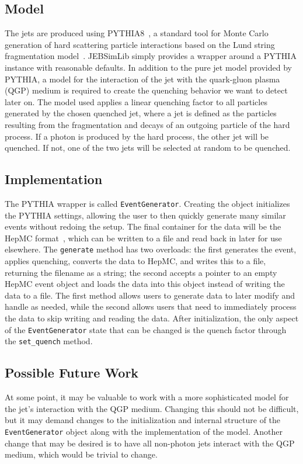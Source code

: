 \documentclass[11pt]{article}
\begin{document}
\subsection{Model}
The jets are produced using PYTHIA8~\cite{Sjostrand:2014zea}, a standard tool for Monte Carlo generation of hard scattering particle interactions based on the Lund string fragmentation model~\cite{Andersson:2002ap}. JEBSimLib simply provides a wrapper around a PYTHIA instance with reasonable defaults. In addition to the pure jet model provided by PYTHIA, a model for the interaction of the jet with the quark-gluon plasma (QGP) medium is required to create the quenching behavior we want to detect later on. The model used applies a linear quenching factor to all particles generated by the chosen quenched jet, where a jet is defined as the particles resulting from the fragmentation and decays of an outgoing particle of the hard process. If a photon is produced by the hard process, the other jet will be quenched. If not, one of the two jets will be selected at random to be quenched.

\subsection{Implementation}
The PYTHIA wrapper is called \texttt{EventGenerator}. Creating the object initializes the PYTHIA settings, allowing the user to then quickly generate many similar events without redoing the setup. The final container for the data will be the HepMC format~\cite{Dobbs:2001ck}, which can be written to a file and read back in later for use elsewhere. The \texttt{generate} method has two overloads: the first generates the event, applies quenching, converts the data to HepMC, and writes this to a file, returning the filename as a string; the second accepts a pointer to an empty HepMC event object and loads the data into this object instead of writing the data to a file. The first method allows users to generate data to later modify and handle as needed, while the second allows users that need to immediately process the data to skip writing and reading the data. After initialization, the only aspect of the \texttt{EventGenerator} state that can be changed is the quench factor through the \texttt{set\_quench} method.

\subsection{Possible Future Work}
At some point, it may be valuable to work with a more sophisticated model for the jet's interaction with the QGP medium. Changing this should not be difficult, but it may demand changes to the initialization and internal structure of the \texttt{EventGenerator} object along with the implementation of the model. Another change that may be desired is to have all non-photon jets interact with the QGP medium, which would be trivial to change.
\end{document}

